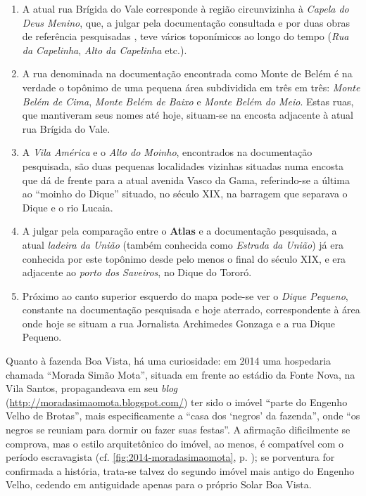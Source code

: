 \begin{enumerate}
\item A atual rua Brígida do Vale corresponde à região circunvizinha à \textit{Capela do Deus Menino}, que, a julgar pela documentação consultada e por duas obras de referência pesquisadas \cite{municipal_atlas_1955,souza_guia_1935}, teve vários toponímicos ao longo do tempo (\textit{Rua da Capelinha}, \textit{Alto da Capelinha} etc.).
\item A rua denominada na documentação encontrada como Monte de Belém é na verdade o topônimo de uma pequena área subdividida em três em três: \textit{Monte Belém de Cima}, \textit{Monte Belém de Baixo} e \textit{Monte Belém do Meio}. Estas ruas, que mantiveram seus nomes até hoje, situam-se na encosta adjacente à atual rua Brígida do Vale.
\item A \textit{Vila América} e o \textit{Alto do Moinho}, encontrados na documentação pesquisada, são duas pequenas localidades vizinhas situadas numa encosta que dá de frente para a atual avenida Vasco da Gama, referindo-se a última ao ``moinho do Dique'' situado, no século XIX, na barragem que separava o Dique e o rio Lucaia.
\item A julgar pela comparação entre o \textbf{Atlas} e a documentação pesquisada, a atual \textit{ladeira da União} (também conhecida como \textit{Estrada da União}) já era conhecida por este topônimo desde pelo menos o final do século XIX, e era adjacente ao \textit{porto dos Saveiros}, no Dique do Tororó.
\item Próximo ao canto superior esquerdo do mapa pode-se ver o \textit{Dique Pequeno}, constante na documentação pesquisada e hoje aterrado, correspondente à área onde hoje se situam a rua Jornalista Archimedes Gonzaga e a rua Dique Pequeno.
\end{enumerate}

Quanto à fazenda Boa Vista, há uma curiosidade: em 2014 uma hospedaria chamada ``Morada Simão Mota'', situada em frente ao estádio da Fonte Nova, na Vila Santos, propagandeava em seu \textit{blog} (\url{http://moradasimaomota.blogspot.com/}) ter sido o imóvel ``parte do Engenho Velho de Brotas'', mais especificamente a ``casa dos `negros' da fazenda'', onde ``os negros se reuniam para dormir ou fazer suas festas''. A afirmação dificilmente se comprova, mas o estilo arquitetônico do imóvel, ao menos, é compatível com o período escravagista (cf. \autoref{fig:2014-moradasimaomota}, p. \pageref{fig:2014-moradasimaomota}); se porventura for confirmada a história, trata-se talvez do segundo imóvel mais antigo do Engenho Velho, cedendo em antiguidade apenas para o próprio Solar Boa Vista.

